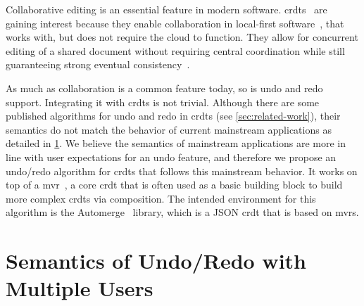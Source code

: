 \documentclass[sigplan]{acmart}
\begin{document}
Collaborative editing is an essential feature in modern software.
\glspl*{crdt}~\cite{preguicca2018conflict} are gaining interest because they
enable collaboration in local-first software~\cite{kleppmann2019local},
that works with, but does not require the cloud to function.
They allow for concurrent editing of a shared document without requiring
central coordination while still guaranteeing strong eventual
consistency~\cite{shapiro2011comprehensive}.

As much as collaboration is a common feature today, so is undo and redo support.
Integrating it with \glspl*{crdt} is not trivial.
Although there are some published algorithms for undo and redo in \glspl*{crdt}
(see \cref{sec:related-work}),
their semantics do not match the behavior of current mainstream applications
as detailed in \cref{sec:semantics}.
We believe the semantics of mainstream applications are more in line with
user expectations for an undo feature, and therefore we propose an undo/redo
algorithm for \glspl{crdt} that follows this mainstream behavior.
It works on top of a \gls*{mvr}~\cite{shapiro2011comprehensive},
a core \gls*{crdt} that is often used as a basic
building block to build more complex \glspl*{crdt} via composition.
The intended environment for this algorithm is the Automerge~\cite{automerge} library,
which is a JSON \gls*{crdt} that is based on \glspl*{mvr}.

\section{Semantics of Undo/Redo with Multiple Users}\label{sec:semantics}
\end{document}
